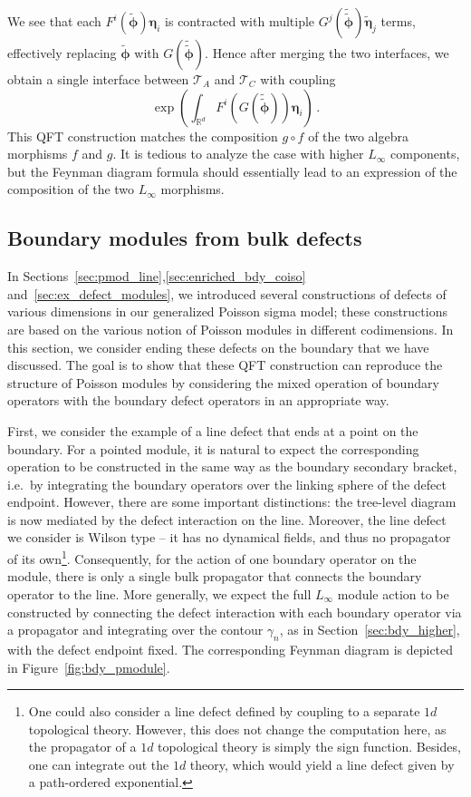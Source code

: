 \documentclass[11pt]{article}
\numberwithin{equation}{section}
\begin{document}
We see that each $F^i(\widetilde{\boldsymbol{\phi}})\boldsymbol{\eta}_i$ is contracted with multiple $G^j(\widetilde{\widetilde{\boldsymbol{\phi}}})\widetilde{\boldsymbol{\eta}}_j$ terms, effectively replacing $\widetilde{\boldsymbol{\phi}}$ with $G(\widetilde{\widetilde{\boldsymbol{\phi}}})$. Hence after merging the two interfaces, we obtain a single interface between $\mathcal{T}_A$ and $\mathcal{T}_C$ with coupling
\begin{equation}
\exp\left( \int_{\mathbb{R}^d} F^i(G(\widetilde{\widetilde{\boldsymbol{\phi}}}))\boldsymbol{\eta}_i \right)\,.
\end{equation}
This QFT construction matches the composition $g\circ f$ of the two algebra morphisms $f$ and $g$. It is tedious to analyze the case with higher $L_\infty$ components, but the Feynman diagram formula should essentially lead to an expression of the composition of the two $L_\infty$ morphisms. 

\subsection{Boundary modules from bulk defects}
In Sections~\ref{sec:pmod_line},\ref{sec:enriched_bdy_coiso} and~\ref{sec:ex_defect_modules}, we introduced several constructions of defects of various dimensions in our generalized Poisson sigma model; these constructions are based on the various notion of Poisson modules in different codimensions. In this section, we consider ending these defects on the boundary that we have discussed. The goal is to show that these QFT construction can reproduce the structure of Poisson modules by considering the mixed operation of boundary operators with the boundary defect operators in an appropriate way. 

First, we consider the example of a line defect that ends at a point on the boundary. For a pointed module, it is natural to expect the corresponding operation to be constructed in the same way as the boundary secondary bracket, i.e.\ by integrating the boundary operators over the linking sphere of the defect endpoint. However, there are some important distinctions: the tree-level diagram is now mediated by the defect interaction on the line. Moreover, the line defect we consider is Wilson type -- it has no dynamical fields, and thus no propagator of its own\footnote{One could also consider a line defect defined by coupling to a separate $1d$ topological theory. However, this does not change the computation here, as the propagator of a $1d$ topological theory is simply the sign function. Besides, one can integrate out the $1d$ theory, which would yield a line defect given by a path-ordered exponential.}. Consequently, for the action of one boundary operator on the module, there is only a single bulk propagator that connects the boundary operator to the line. More generally, we expect the full $L_\infty$ module action to be constructed by connecting the defect interaction with each boundary operator via a propagator and integrating over the contour $\gamma_n$, as in Section~\ref{sec:bdy_higher}, with the defect endpoint fixed. The corresponding Feynman diagram is depicted in Figure~\ref{fig:bdy_pmodule}.
\end{document}
